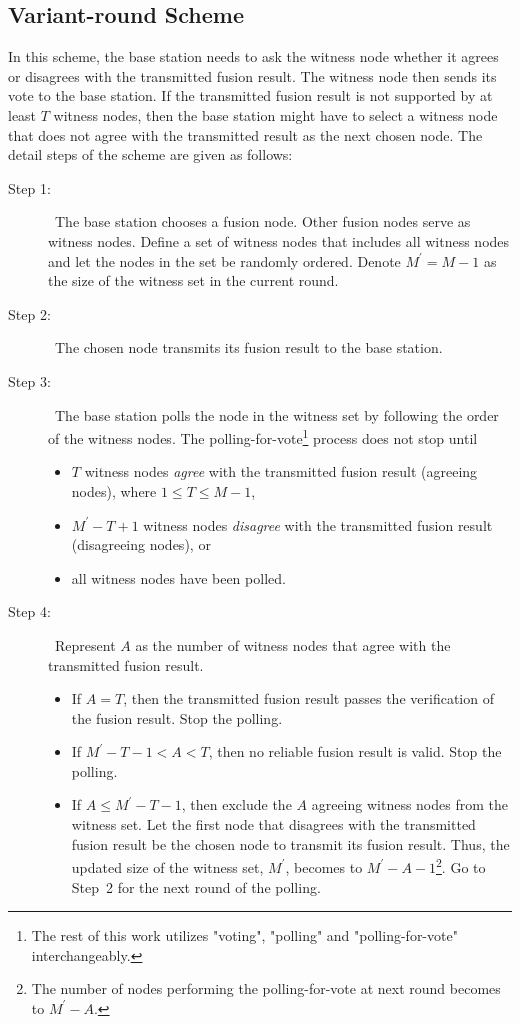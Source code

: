 \documentclass[12pt, onecolumn, draftcls]{IEEEtran}
\begin{document}
\subsection{Variant-round Scheme}
\label{subsec:variant} In this scheme, the base station needs to ask
the witness node whether it agrees or disagrees with the transmitted
fusion result. The witness node then sends its vote to the base
station. If the transmitted fusion result is not supported by at
least $T$ witness nodes, then the base station might have to select
a witness node that does not agree with the transmitted result as
the next chosen node. The detail steps of the scheme are given as
follows:
\begin{description}
\item[Step 1: ]\ The base station chooses a fusion node.
Other fusion nodes serve as witness nodes. Define a set of witness
nodes that includes all witness nodes and let the nodes in the set
be randomly ordered. Denote $M^{\prime} = M-1$ as the size of the
witness set in the current round.

\item[Step 2: ]\ The chosen node transmits its fusion result to
the base station.

\item[Step 3: ]\ The base station polls the node in the witness set by
following the order of the witness nodes. The
polling-for-vote\footnote{The rest of this work utilizes "voting",
"polling" and "polling-for-vote" interchangeably.} process does not
stop until
\begin{itemize}
 \item $T$ witness nodes {\it agree} with the transmitted fusion result (agreeing nodes), where $1 \le T
       \le M-1$,
 \item $M^{\prime}-T+1$ witness nodes {\it disagree} with the transmitted fusion
 result (disagreeing nodes), or
 \item all witness nodes have been polled.
\end{itemize}
\item[Step 4: ]\ Represent $A$ as the number of witness nodes that agree
with the transmitted fusion result.
\begin{itemize}
 \item If $A = T$, then the transmitted fusion result passes the
 verification of the fusion result. Stop the polling.
\item If $M^{\prime}-T-1<A<T$, then no reliable fusion result is valid.
 Stop the polling.
 \item If $A \le M^{\prime}-T-1$, then exclude the $A$ agreeing witness nodes
from the witness set. Let the first node that disagrees with the
transmitted fusion result be the chosen node to transmit its fusion
result. Thus, the updated size of the witness set, $M^{\prime}$,
becomes to $M^{\prime}-A-1$\footnote{The number of nodes performing
the polling-for-vote at next round becomes to $M^{\prime}-A$.}. Go
to Step~2 for the next round of the polling.
\end{itemize}
\end{description}
\end{document}
